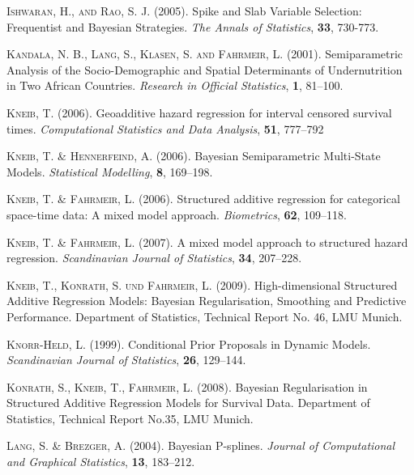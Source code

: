 \begin{thebibliography}{99}
 {\scshape Ishwaran, H., and Rao, S. J.} (2005). Spike and Slab Variable 
 Selection: Frequentist and Bayesian Strategies. {\it The Annals of Statistics}, 
 {\bf 33}, 730-773.
 
 {\scshape Kandala, N. B., Lang, S., Klasen, S. and Fahrmeir, L.} (2001).
 Semiparametric Analysis of the Socio-Demographic and Spatial Determinants of Undernutrition in Two African Countries.
 {\it Research in Official Statistics}, {\bf 1}, 81--100.

 {\scshape Kneib, T.} (2006).
 Geoadditive hazard regression for interval censored survival times.
 {\it Computational Statistics and Data Analysis}, {\bf 51}, 777--792

 {\scshape Kneib, T. \& Hennerfeind, A.} (2006).
 Bayesian Semiparametric Multi-State Models.
 {\it Statistical Modelling}, {\bf 8}, 169--198.

 {\scshape Kneib, T. \& Fahrmeir, L.} (2006).
 Structured additive regression for categorical space-time data: A mixed model approach.
 {\it Biometrics}, {\bf 62}, 109--118.

 {\scshape Kneib, T. \& Fahrmeir, L.} (2007).
 A mixed model approach to structured hazard regression.
 {\it Scandinavian Journal of Statistics}, {\bf 34}, 207--228.

 {\scshape Kneib, T., Konrath, S. und Fahrmeir, L.} (2009). High-dimensional 
 Structured Additive Regression Models: Bayesian Regularisation, Smoothing and Predictive 
 Performance. Department of Statistics, Technical Report No. 46, LMU Munich.

 {\scshape Knorr-Held, L.} (1999).
 Conditional Prior Proposals in Dynamic Models.
 {\it Scandinavian Journal of Statistics}, {\bf 26}, 129--144.

 {\scshape Konrath, S., Kneib, T., Fahrmeir, L.} (2008). Bayesian Regularisation 
 in Structured Additive Regression Models for Survival Data. Department of Statistics, 
 Technical Report No.35, LMU Munich.
 
 {\scshape Lang, S. \& Brezger, A.} (2004).
 Bayesian P-splines.
 {\it Journal of Computational and Graphical Statistics}, {\bf 13}, 183--212.


\end{thebibliography}

